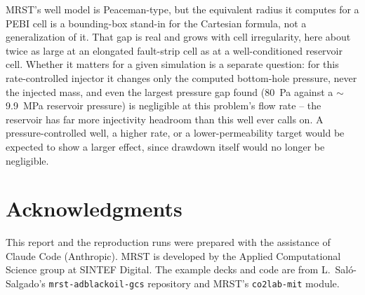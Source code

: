 \documentclass[preprint,11pt]{elsarticle}
\begin{document}
MRST's well model is Peaceman-type, but the equivalent radius it computes
for a PEBI cell is a bounding-box stand-in for the Cartesian formula, not
a generalization of it. That gap is real and grows with cell irregularity,
here about twice as large at an elongated fault-strip cell as at a
well-conditioned reservoir cell. Whether it matters for a given simulation
is a separate question: for this rate-controlled injector it changes only
the computed bottom-hole pressure, never the injected mass, and even the
largest pressure gap found (80~Pa against a $\sim$9.9~MPa reservoir
pressure) is negligible at this problem's flow rate -- the reservoir has
far more injectivity headroom than this well ever calls on. A
pressure-controlled well, a higher rate, or a lower-permeability target
would be expected to show a larger effect, since drawdown itself would no
longer be negligible.

\section*{Acknowledgments}

This report and the reproduction runs were prepared with the assistance
of Claude Code (Anthropic). MRST is developed by the Applied
Computational Science group at SINTEF Digital. The example decks and
code are from L.~Sal\'o-Salgado's \texttt{mrst-adblackoil-gcs}
repository and MRST's \texttt{co2lab-mit} module.
\end{document}

